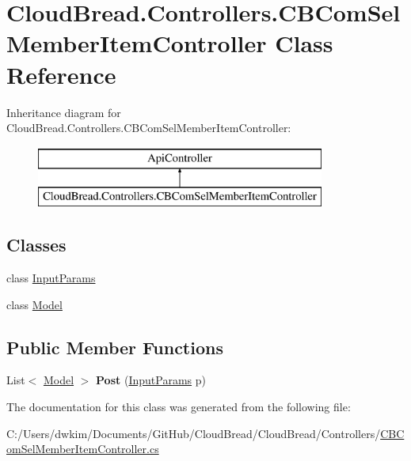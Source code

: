 \hypertarget{class_cloud_bread_1_1_controllers_1_1_c_b_com_sel_member_item_controller}{}\section{Cloud\+Bread.\+Controllers.\+C\+B\+Com\+Sel\+Member\+Item\+Controller Class Reference}
\label{class_cloud_bread_1_1_controllers_1_1_c_b_com_sel_member_item_controller}
Inheritance diagram for Cloud\+Bread.\+Controllers.\+C\+B\+Com\+Sel\+Member\+Item\+Controller\+:\begin{figure}[H]
\begin{center}
\leavevmode
\includegraphics[height=2.000000cm]{class_cloud_bread_1_1_controllers_1_1_c_b_com_sel_member_item_controller}
\end{center}
\end{figure}
\subsection*{Classes}
\begin{DoxyCompactItemize}
\item 
class \hyperlink{class_cloud_bread_1_1_controllers_1_1_c_b_com_sel_member_item_controller_1_1_input_params}{Input\+Params}
\item 
class \hyperlink{class_cloud_bread_1_1_controllers_1_1_c_b_com_sel_member_item_controller_1_1_model}{Model}
\end{DoxyCompactItemize}
\subsection*{Public Member Functions}
\begin{DoxyCompactItemize}
\item 
List$<$ \hyperlink{class_cloud_bread_1_1_controllers_1_1_c_b_com_sel_member_item_controller_1_1_model}{Model} $>$ {\bfseries Post} (\hyperlink{class_cloud_bread_1_1_controllers_1_1_c_b_com_sel_member_item_controller_1_1_input_params}{Input\+Params} p)\hypertarget{class_cloud_bread_1_1_controllers_1_1_c_b_com_sel_member_item_controller_aea063fa18a972ddbe9741f3c1d17af63}{}\label{class_cloud_bread_1_1_controllers_1_1_c_b_com_sel_member_item_controller_aea063fa18a972ddbe9741f3c1d17af63}

\end{DoxyCompactItemize}


The documentation for this class was generated from the following file\+:\begin{DoxyCompactItemize}
\item 
C\+:/\+Users/dwkim/\+Documents/\+Git\+Hub/\+Cloud\+Bread/\+Cloud\+Bread/\+Controllers/\hyperlink{_c_b_com_sel_member_item_controller_8cs}{C\+B\+Com\+Sel\+Member\+Item\+Controller.\+cs}\end{DoxyCompactItemize}
